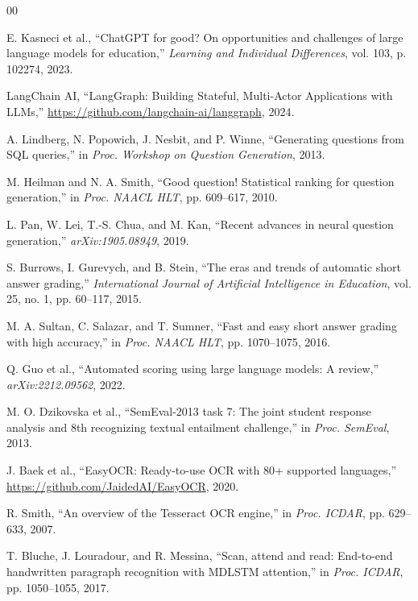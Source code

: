 \documentclass[conference]{IEEEtran}
\begin{document}
\begin{thebibliography}{00}

E. Kasneci et al., ``ChatGPT for good? On opportunities and challenges of large language models for education,'' \textit{Learning and Individual Differences}, vol. 103, p. 102274, 2023.

LangChain AI, ``LangGraph: Building Stateful, Multi-Actor Applications with LLMs,'' \url{https://github.com/langchain-ai/langgraph}, 2024.

A. Lindberg, N. Popowich, J. Nesbit, and P. Winne, ``Generating questions from SQL queries,'' in \textit{Proc. Workshop on Question Generation}, 2013.

M. Heilman and N. A. Smith, ``Good question! Statistical ranking for question generation,'' in \textit{Proc. NAACL HLT}, pp. 609--617, 2010.

L. Pan, W. Lei, T.-S. Chua, and M. Kan, ``Recent advances in neural question generation,'' \textit{arXiv:1905.08949}, 2019.

S. Burrows, I. Gurevych, and B. Stein, ``The eras and trends of automatic short answer grading,'' \textit{International Journal of Artificial Intelligence in Education}, vol. 25, no. 1, pp. 60--117, 2015.

M. A. Sultan, C. Salazar, and T. Sumner, ``Fast and easy short answer grading with high accuracy,'' in \textit{Proc. NAACL HLT}, pp. 1070--1075, 2016.

Q. Guo et al., ``Automated scoring using large language models: A review,'' \textit{arXiv:2212.09562}, 2022.

M. O. Dzikovska et al., ``SemEval-2013 task 7: The joint student response analysis and 8th recognizing textual entailment challenge,'' in \textit{Proc. SemEval}, 2013.

J. Baek et al., ``EasyOCR: Ready-to-use OCR with 80+ supported languages,'' \url{https://github.com/JaidedAI/EasyOCR}, 2020.

R. Smith, ``An overview of the Tesseract OCR engine,'' in \textit{Proc. ICDAR}, pp. 629--633, 2007.

T. Bluche, J. Louradour, and R. Messina, ``Scan, attend and read: End-to-end handwritten paragraph recognition with MDLSTM attention,'' in \textit{Proc. ICDAR}, pp. 1050--1055, 2017.

\end{thebibliography}
\end{document}
